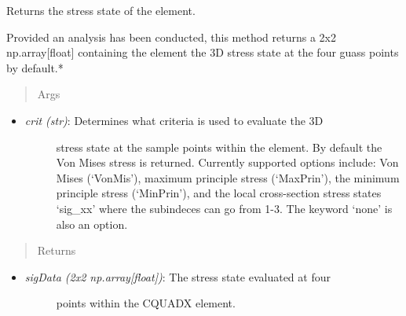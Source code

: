 \documentclass[letterpaper,10pt,english]{sphinxmanual}
\begin{document}
\begin{fulllineitems}
\begin{fulllineitems}
\end{fulllineitems}


\begin{fulllineitems}
\label{structures:AeroComBAT.Structures.CQUADX.getStressState}
Returns the stress state of the element.

Provided an analysis has been conducted, this method
returns a 2x2 np.array{[}float{]} containing the element the 3D stress
state at the four guass points by default.*
\begin{quote}\begin{description}
\item[{Args}] \leavevmode
\end{description}\end{quote}
\begin{itemize}
\item {} \begin{description}
\item[{\emph{crit (str)}: Determines what criteria is used to evaluate the 3D}] \leavevmode
stress state at the sample points within the element. By
default the Von Mises stress is returned. Currently supported
options include: Von Mises (`VonMis'), maximum principle stress
(`MaxPrin'), the minimum principle stress (`MinPrin'), and the
local cross-section stress states `sig\_xx' where the subindeces can
go from 1-3. The keyword `none' is also an option.

\end{description}

\end{itemize}
\begin{quote}\begin{description}
\item[{Returns}] \leavevmode
\end{description}\end{quote}
\begin{itemize}
\item {} \begin{description}
\item[{\emph{sigData (2x2 np.array{[}float{]})}: The stress state evaluated at four}] \leavevmode
points within the CQUADX element.

\end{description}

\end{itemize}


\end{fulllineitems}
\end{fulllineitems}
\end{document}
